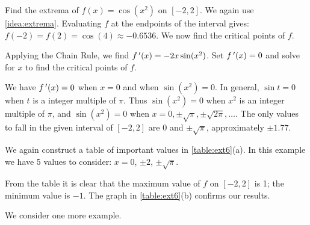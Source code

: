 \begin{example}\label{ex_extval6}%
Find the extrema of  $f(x) = \cos (x^2)$ on $[-2,2]$.
\solution
We again use \autoref{idea:extrema}. Evaluating $f$ at the endpoints of the interval gives: $f(-2) = f(2) = \cos (4) \approx -0.6536.$ We now find the critical points of $f$.

Applying the Chain Rule, we find $f\,'(x) = -2x\sin (x^2)$. Set $f\,'(x) = 0$ and solve for $x$ to find the critical points of $f$. 

We have $f\,'(x) = 0$ when $x = 0$ and when $\sin (x^2) = 0$. In general, $\sin t = 0$ when $t$ is a integer multiple of $\pi$.
Thus $\sin (x^2) = 0$ when $x^2$ is an integer multiple of $\pi$, and
$\sin (x^2)=0$ when $x=0, \pm\sqrt\pi, \pm\sqrt{2\pi}, \dotsc$. The only values to fall in the given interval of $[-2,2]$ are $0$ and $\pm\sqrt\pi$, approximately $\pm 1.77$.

We again construct a table of important values in \autoref{table:ext6}(a). In this example we have 5 values to consider: $x= 0$, $\pm 2$, $\pm\sqrt{\pi}$. 

From the table it is clear that the maximum value of $f$ on $[-2,2]$ is 1; the minimum value is $-1$. The graph in \autoref{table:ext6}(b) confirms our results.
\end{example}

We consider one more example.


